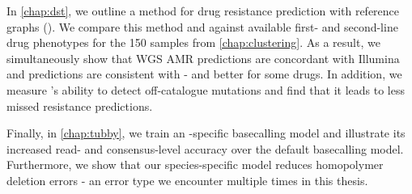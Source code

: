 In \autoref{chap:dst}, we outline a method for drug resistance prediction with \pandora{} reference graphs (\drprg{}). We compare this method and \mykrobe{} against available first- and second-line drug phenotypes for the 150 samples from \autoref{chap:clustering}. As a result, we simultaneously show that \ont{} WGS AMR predictions are concordant with Illumina and \drprg{} predictions are consistent with \mykrobe{} - and better for some drugs. In addition, we measure \drprg{}'s ability to detect off-catalogue mutations and find that it leads to less missed resistance predictions.

Finally, in \autoref{chap:tubby}, we train an \mtb{}-specific \ont{} basecalling model and illustrate its increased read- and consensus-level accuracy over the default basecalling model. Furthermore, we show that our species-specific model reduces homopolymer deletion errors - an error type we encounter multiple times in this thesis.